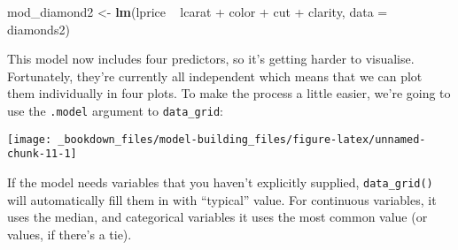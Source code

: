 \documentclass[]{book}
\newenvironment{Shaded}{\begin{snugshade}}{\end{snugshade}}
\newcommand{\KeywordTok}[1]{\textcolor[rgb]{0.13,0.29,0.53}{\textbf{{#1}}}}
\newcommand{\DataTypeTok}[1]{\textcolor[rgb]{0.13,0.29,0.53}{{#1}}}
\newcommand{\StringTok}[1]{\textcolor[rgb]{0.31,0.60,0.02}{{#1}}}
\newcommand{\CommentTok}[1]{\textcolor[rgb]{0.56,0.35,0.01}{\textit{{#1}}}}
\newcommand{\NormalTok}[1]{{#1}}
\begin{document}
\begin{Shaded}
\begin{Highlighting}[]
\NormalTok{mod_diamond2 <-}\StringTok{ }\KeywordTok{lm}\NormalTok{(lprice ~}\StringTok{ }\NormalTok{lcarat +}\StringTok{ }\NormalTok{color +}\StringTok{ }\NormalTok{cut +}\StringTok{ }\NormalTok{clarity, }\DataTypeTok{data =} \NormalTok{diamonds2)}
\end{Highlighting}
\end{Shaded}

This model now includes four predictors, so it's getting harder to
visualise. Fortunately, they're currently all independent which means
that we can plot them individually in four plots. To make the process a
little easier, we're going to use the \texttt{.model} argument to
\texttt{data\_grid}:

\begin{Shaded}
\end{Shaded}

\begin{center}\texttt{[image: \_bookdown\_files/model-building\_files/figure-latex/unnamed-chunk-11-1]} \end{center}

If the model needs variables that you haven't explicitly supplied,
\texttt{data\_grid()} will automatically fill them in with ``typical''
value. For continuous variables, it uses the median, and categorical
variables it uses the most common value (or values, if there's a tie).
\end{document}
